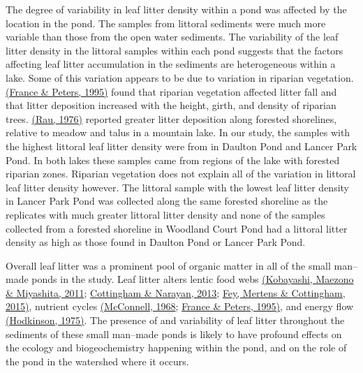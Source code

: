 \documentclass[12pt,letter]{article}
\begin{document}
The degree of variability in leaf litter density within a pond was affected by the location in the pond. The samples from littoral sediments were much more variable than those from the open water sediments.  The variability of the leaf litter density in the littoral samples within each pond suggests that the factors affecting leaf litter accumulation in the sediments are heterogeneous within a lake. Some of this variation appears to be due to variation in riparian vegetation. \hyperref[csl:37]{(France \& Peters, 1995)} found that riparian vegetation affected litter fall and that litter deposition increased with the height, girth, and density of riparian trees. \hyperref[csl:36]{(Rau, 1976)} reported greater litter deposition along forested shorelines, relative to meadow and talus in a mountain lake. In our study, the samples with the highest littoral leaf litter density were from in Daulton Pond and Lancer Park Pond. In both lakes these samples came from regions of the lake with forested riparian zones. Riparian vegetation does not explain all of the variation in littoral leaf litter density however. The littoral sample with the lowest leaf litter density in Lancer Park Pond was collected along the same forested shoreline as the replicates with much greater littoral litter density and none of the samples collected from a forested shoreline in Woodland Court Pond had a littoral litter density as high as those found in Daulton Pond or Lancer Park Pond. 

Overall leaf litter was a prominent pool of organic matter in all of the small man--made ponds in the study. Leaf litter alters lentic food webs \hyperref[csl:10]{(Kobayashi, Maezono \& Miyashita, 2011}; \hyperref[csl:39]{Cottingham \& Narayan, 2013}; \hyperref[csl:40]{Fey, Mertens \& Cottingham, 2015)}, nutrient cycles \hyperref[csl:41]{(McConnell, 1968}; \hyperref[csl:37]{France \& Peters, 1995)}, and energy flow \hyperref[csl:5]{(Hodkinson, 1975)}. The presence of and variability of leaf litter throughout the sediments of these small man--made ponds is likely to have profound effects on the ecology and biogeochemistry happening within the pond, and on the role of the pond in the watershed where it occurs.
\end{document}
